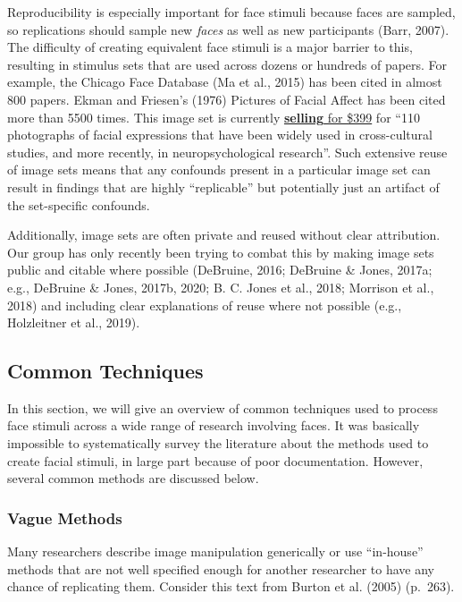 \documentclass[
  doc,floatsintext]{apa6}
\begin{document}
Reproducibility is especially important for face stimuli because faces are sampled, so replications should sample new \emph{faces} as well as new participants (Barr, 2007). The difficulty of creating equivalent face stimuli is a major barrier to this, resulting in stimulus sets that are used across dozens or hundreds of papers. For example, the Chicago Face Database (Ma et al., 2015) has been cited in almost 800 papers. Ekman and Friesen's (1976) Pictures of Facial Affect has been cited more than 5500 times. This image set is currently \href{https://www.paulekman.com/product/pictures-of-facial-affect-pofa/}{\textbf{selling} for \$399} for ``110 photographs of facial expressions that have been widely used in cross-cultural studies, and more recently, in neuropsychological research''. Such extensive reuse of image sets means that any confounds present in a particular image set can result in findings that are highly ``replicable'' but potentially just an artifact of the set-specific confounds.

Additionally, image sets are often private and reused without clear attribution. Our group has only recently been trying to combat this by making image sets public and citable where possible (DeBruine, 2016; DeBruine \& Jones, 2017a; e.g., DeBruine \& Jones, 2017b, 2020; B. C. Jones et al., 2018; Morrison et al., 2018) and including clear explanations of reuse where not possible (e.g., Holzleitner et al., 2019).

\hypertarget{common-techniques}{%
\subsection{Common Techniques}\label{common-techniques}}

In this section, we will give an overview of common techniques used to process face stimuli across a wide range of research involving faces. It was basically impossible to systematically survey the literature about the methods used to create facial stimuli, in large part because of poor documentation. However, several common methods are discussed below.

\hypertarget{vague-methods}{%
\subsubsection{Vague Methods}\label{vague-methods}}

Many researchers describe image manipulation generically or use ``in-house'' methods that are not well specified enough for another researcher to have any chance of replicating them. Consider this text from Burton et al. (2005) (p.~263).
\end{document}
